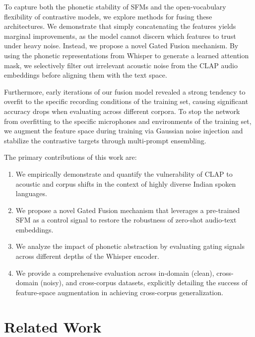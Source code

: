\documentclass[conference]{IEEEtran}
\begin{document}
To capture both the phonetic stability of SFMs and the open-vocabulary flexibility of contrastive models, we explore methods for fusing these architectures. We demonstrate that simply concatenating the features yields marginal improvements, as the model cannot discern which features to trust under heavy noise. Instead, we propose a novel Gated Fusion mechanism. By using the phonetic representations from Whisper to generate a learned attention mask, we selectively filter out irrelevant acoustic noise from the CLAP audio embeddings before aligning them with the text space. 

Furthermore, early iterations of our fusion model revealed a strong tendency to overfit to the specific recording conditions of the training set, causing significant accuracy drops when evaluating across different corpora. To stop the network from overfitting to the specific microphones and environments of the training set, we augment the feature space during training via Gaussian noise injection and stabilize the contrastive targets through multi-prompt ensembling.

The primary contributions of this work are:
\begin{enumerate}
    \item We empirically demonstrate and quantify the vulnerability of CLAP to acoustic and corpus shifts in the context of highly diverse Indian spoken languages.
    \item We propose a novel Gated Fusion mechanism that leverages a pre-trained SFM as a control signal to restore the robustness of zero-shot audio-text embeddings.
    \item We analyze the impact of phonetic abstraction by evaluating gating signals across different depths of the Whisper encoder.
    \item We provide a comprehensive evaluation across in-domain (clean), cross-domain (noisy), and cross-corpus datasets, explicitly detailing the success of feature-space augmentation in achieving cross-corpus generalization.
\end{enumerate}

\section{Related Work}
\end{document}
